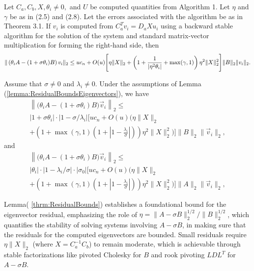 \begin{lemma}\label{lemma:ResidualBoundsEigenvectors}
		Let $C_a, C_b, X, \theta_i \neq 0,$ and $U$ be computed quantities from Algorithm 1. Let $\eta$ and $\gamma$ be as in (2.5) and (2.8). Let the errors associated with the algorithm be as in Theorem 3.1. If $v_i$ is computed from $C_a^T v_i = D_a X u_i$ using a backward stable algorithm for the solution of the system and standard matrix-vector multiplication for forming the right-hand side, then
		\[
		\| \left( \theta_i A - (1 + \sigma \theta_i) B \right) v_i \|_2 \leq u c_n + O(u) \Bigg[ \eta \| X \|_2 \\
		+ \left( 1 + \frac{1}{| \eta^2 \theta_i |} + \max(\gamma, 1) \right) \eta^2 \| X \|_2^2 \Bigg] \| B \|_2 \| v_i \|_2.\]
\end{lemma}

\begin{theorem}\label{thrm:ResidualBounds}
	Assume that $\sigma\neq 0$ and $\lambda_i\neq 0$.  Under the assumptions of Lemma (\ref{lemma:ResidualBoundsEigenvectors}), we have
	\begin{multline*}
		\left\| \big(\theta_i A - (1+\sigma \theta_i) B\big) \vec{v}_i \right\|_2
		\leq \\
		|1+\sigma \theta_i| \cdot |1-\sigma/\lambda_i| \Bigg[
		uc_n +O(u)\Bigg( \eta\|X\|_2 \\
		+ \left(1 + \max(\gamma, 1)
		\left(1+ \left| 1 - \frac{\lambda_i}{\sigma}\right|\right)\right)
		\eta^2\|X\|_2^2 \Bigg) \Bigg] \|B\|_2 \|\vec{v}_i\|_2,
	\end{multline*}
	and
	\begin{multline*}
		\left\| \big(\theta_i A - (1+\sigma \theta_i) B\big) \vec{v}_i \right\|_2
		\leq \\
		|\theta_i| \cdot |1-\lambda_i/\sigma| \cdot |\sigma_0| \Bigg[
		uc_n +O(u)\Bigg( \eta\|X\|_2 \\
		+ \left(1 + \max(\gamma, 1) \left(1+ \left| 1
		- \frac{\lambda_i}{\sigma}\right|\right)\right)
		\eta^2\|X\|_2^2 \Bigg) \Bigg] \|A\|_2 \|\vec{v}_i\|_2,
	\end{multline*}
\end{theorem}
Lemma( \ref{thrm:ResidualBounds}) establishes a foundational bound for the eigenvector residual, emphasizing the role of $\eta = \|A - \sigma B\|_2^{1/2}/\|B\|_2^{1/2} $, which quantifies the stability of solving systems involving $A-\sigma B$, in making sure that the residuals for the computed eigenvectors are bounded. Small residuals require $\eta \|X\|_2$ (where $X = C_a^{-1}C_b$) to remain moderate, which is achievable through stable factorizations like pivoted Cholesky for $B$ and rook pivoting $LDL^T$ for $A-\sigma B$.

